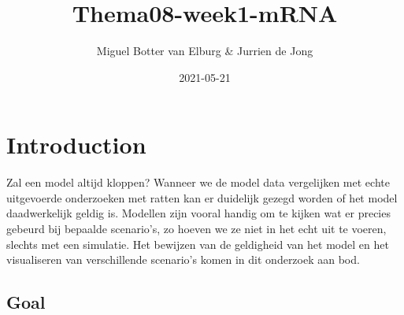 \documentclass[
]{article}
\title{Thema08-week1-mRNA}
\author{Miguel Botter van Elburg \& Jurrien de Jong}
\date{2021-05-21}
\newenvironment{Shaded}{\begin{snugshade}}{\end{snugshade}}
\newcommand{\AttributeTok}[1]{\textcolor[rgb]{0.77,0.63,0.00}{#1}}
\newcommand{\DecValTok}[1]{\textcolor[rgb]{0.00,0.00,0.81}{#1}}
\newcommand{\FloatTok}[1]{\textcolor[rgb]{0.00,0.00,0.81}{#1}}
\newcommand{\FunctionTok}[1]{\textcolor[rgb]{0.00,0.00,0.00}{#1}}
\newcommand{\NormalTok}[1]{#1}
\newcommand{\OtherTok}[1]{\textcolor[rgb]{0.56,0.35,0.01}{#1}}
\newcommand{\SpecialCharTok}[1]{\textcolor[rgb]{0.00,0.00,0.00}{#1}}
\newcommand{\StringTok}[1]{\textcolor[rgb]{0.31,0.60,0.02}{#1}}
\begin{document}
\maketitle

\begin{Shaded}
\end{Shaded}

\hypertarget{introduction}{%
\section{Introduction}\label{introduction}}

Zal een model altijd kloppen? Wanneer we de model data vergelijken met
echte uitgevoerde onderzoeken met ratten kan er duidelijk gezegd worden
of het model daadwerkelijk geldig is. Modellen zijn vooral handig om te
kijken wat er precies gebeurd bij bepaalde scenario's, zo hoeven we ze
niet in het echt uit te voeren, slechts met een simulatie. Het bewijzen
van de geldigheid van het model en het visualiseren van verschillende
scenario's komen in dit onderzoek aan bod.

\hypertarget{goal}{%
\subsection{Goal}\label{goal}}
\end{document}

